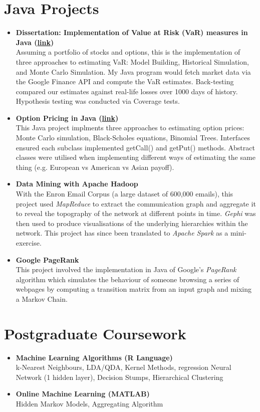 \documentclass[letterpaper,11pt]{article}
\newcommand{\resumeItem}[2]{
  \item\small{
    \textbf{#1\\}{ #2 \vspace{-2pt}}
  }
}
\newcommand{\resumeSubItem}[2]{\resumeItem{#1}{#2}\vspace{-4pt}}
\newcommand{\resumeSubHeadingListStart}{\begin{itemize}[leftmargin=*]}
\newcommand{\resumeSubHeadingListEnd}{\end{itemize}}
\begin{document}
\section{Java Projects}
  \resumeSubHeadingListStart
	\resumeSubItem
	{Dissertation: Implementation of Value at Risk (VaR) measures in Java (\href{https://adrian.ng/java/var/}{link})}
	{Assuming a portfolio of stocks and options, this is the implementation of three approaches to estimating VaR: Model Building, Historical Simulation, and Monte Carlo Simulation. My Java program would fetch market data via the Google Finance API and compute the VaR estimates. Back-testing compared our estimates against real-life losses over 1000 days of history. Hypothesis testing was conducted via Coverage tests.}
	\resumeSubItem{Option Pricing in Java (\href{https://adrian.ng/java/options/}{link})}
	{This Java project implments three approaches to estimating option prices: Monte Carlo simulation, Black-Scholes equations, Binomial Trees. Interfaces ensured each subclass implemented getCall() and getPut() methods. Abstract classes were utilised when implementing different ways of estimating the same thing (e.g. European vs American vs Asian payoff).}  	
	\resumeSubItem{Data Mining with Apache Hadoop}
      		{With the Enron Email Corpus (a large dataset of 600,000 emails), this project used \textit{MapReduce} to extract the communication graph and aggregate it to reveal the topography of the network at different points in time. \textit{Gephi} was then used to produce visualisations of the underlying hierarchies within the network. This project has since been translated to \textit{Apache Spark} as a mini-exercise.}      		
	\resumeSubItem{Google PageRank}
		{This project involved the implementation in Java of Google's \textit{PageRank} algorithm which simulates the behaviour of someone browsing a series of webpages by computing a transition matrix from an input graph and mixing a Markov Chain.}		
  \resumeSubHeadingListEnd



\section{Postgraduate Coursework}
  \resumeSubHeadingListStart
	\resumeSubItem{Machine Learning Algorithms (R Language)}
	{k-Nearest Neighbours, LDA/QDA, Kernel Methods, regression Neural Network (1 hidden layer), Decision Stumps, Hierarchical Clustering}
	\resumeSubItem{Online Machine Learning (MATLAB)}
	{Hidden Markov Models, Aggregating Algorithm}
  \resumeSubHeadingListEnd
  
\end{document}
